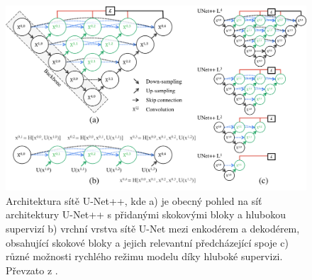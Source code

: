 \begin{figure}[ht]
\centering
\includegraphics[width=1.0\textwidth,keepaspectratio]{Figures/unetpp.png}
\caption[Architektura sítě U-Net++]
{Architektura sítě U-Net++, kde a) je obecný pohled na síť architektury U-Net++ s přidanými skokovými bloky a hlubokou supervizí \uppercase\expandafter{ \relax} b) vrchní vrstva sítě U-Net mezi enkodérem a dekodérem, obsahující skokové bloky a jejich relevantní předcházející spoje c) různé možnosti rychlého režimu modelu díky hluboké supervizi. Převzato z \cite{unetpp}. }
\label{fig:unetpp}
\end{figure}

\endinput